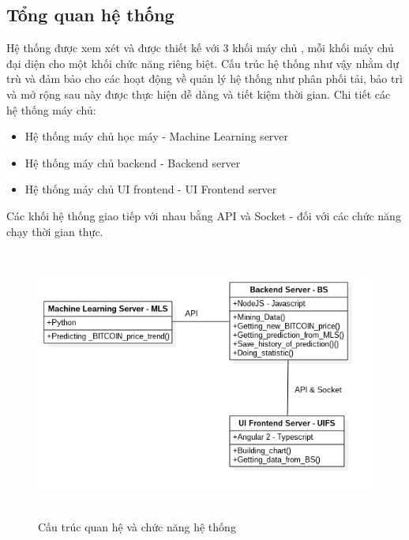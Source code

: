 \subsection{Tổng quan hệ thống}
Hệ thống được xem xét và được thiết kế với 3 khối máy chủ , mỗi khối máy chủ đại 
diện cho một khối chức năng riêng biệt. Cấu trúc hệ thống như vậy nhằm dự trù và đảm bảo 
cho các hoạt động về quản lý hệ thống như phân phối tải, bảo trì và mở rộng sau 
này được thực hiện dễ dàng và tiết kiệm thời gian. Chi tiết các hệ thống máy chủ:
\begin{itemize}
\item Hệ thống máy chủ học máy - Machine Learning server
\item Hệ thống máy chủ backend - Backend server
\item Hệ thống máy chủ UI frontend - UI Frontend server
\end{itemize}
Các khối hệ thống giao tiếp với nhau bằng API và Socket - đối với các chức năng
chạy thời gian thực.\\
\begin{figure}[h!]
\centering
\includegraphics[height=3.5in, keepaspectratio=true]{system.png}
\caption{Cấu trúc quan hệ và chức năng hệ thống}
\end{figure}
